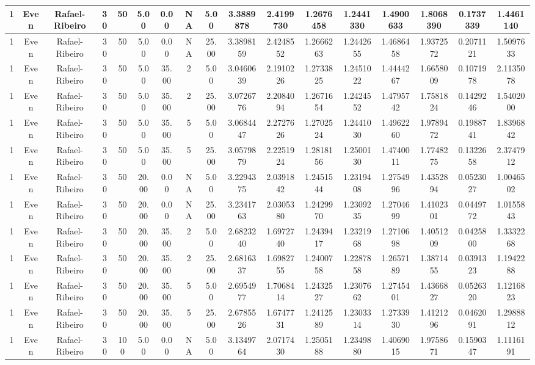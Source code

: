 \documentclass[a4paper]{article}
\begin{document}
\begin{center}
\begin{tabular}{ | c | c | c | c | c | c | c | c | c | c | c | c | c | c | c | c | c | }
		\hline
		1	&	Even	&	Rafael-Ribeiro	&	30	&	50	&	5.00	&	0.00	&	NA	&	5.00	&	3.3889878	&	2.4199730	&	1.2676458	&	1.2441330	&	1.4900633	&	1.8068390	&	0.1737339	&	1.4461140 \\
		\hline
		1	&	Even	&	Rafael-Ribeiro	&	30	&	50	&	5.00	&	0.00	&	NA	&	25.00	&	3.3898159	&	2.4248552	&	1.2666263	&	1.2442655	&	1.4686458	&	1.9372572	&	0.2071121	&	1.5097633 \\
		\hline
		1	&	Even	&	Rafael-Ribeiro	&	30	&	50	&	5.00	&	35.00	&	2	&	5.00	&	3.0460639	&	2.1910226	&	1.2733825	&	1.2451022	&	1.4444267	&	1.6658009	&	0.1071978	&	2.1135078 \\
		\hline
		1	&	Even	&	Rafael-Ribeiro	&	30	&	50	&	5.00	&	35.00	&	2	&	25.00	&	3.0726776	&	2.2084094	&	1.2671654	&	1.2424552	&	1.4795742	&	1.7581824	&	0.1429246	&	1.5402000 \\
		\hline
		1	&	Even	&	Rafael-Ribeiro	&	30	&	50	&	5.00	&	35.00	&	5	&	5.00	&	3.0684447	&	2.2727626	&	1.2702524	&	1.2441030	&	1.4962260	&	1.9789472	&	0.1988741	&	1.8396842 \\
		\hline
		1	&	Even	&	Rafael-Ribeiro	&	30	&	50	&	5.00	&	35.00	&	5	&	25.00	&	3.0579879	&	2.2251924	&	1.2818156	&	1.2500130	&	1.4740011	&	1.7748275	&	0.1322658	&	2.3747912 \\
		\hline
		1	&	Even	&	Rafael-Ribeiro	&	30	&	50	&	20.00	&	0.00	&	NA	&	5.00	&	3.2294375	&	2.0391842	&	1.2451544	&	1.2319408	&	1.2754996	&	1.4352894	&	0.0523027	&	1.0046502 \\
		\hline
		1	&	Even	&	Rafael-Ribeiro	&	30	&	50	&	20.00	&	0.00	&	NA	&	25.00	&	3.2341763	&	2.0305380	&	1.2429970	&	1.2309235	&	1.2704699	&	1.4102301	&	0.0449772	&	1.0155843 \\
		\hline
		1	&	Even	&	Rafael-Ribeiro	&	30	&	50	&	20.00	&	35.00	&	2	&	5.00	&	2.6823240	&	1.6972740	&	1.2439417	&	1.2321968	&	1.2710698	&	1.4051209	&	0.0425800	&	1.3332268 \\
		\hline
		1	&	Even	&	Rafael-Ribeiro	&	30	&	50	&	20.00	&	35.00	&	2	&	25.00	&	2.6816337	&	1.6982755	&	1.2400758	&	1.2287858	&	1.2657189	&	1.3871455	&	0.0391323	&	1.1942288 \\
		\hline
		1	&	Even	&	Rafael-Ribeiro	&	30	&	50	&	20.00	&	35.00	&	5	&	5.00	&	2.6954977	&	1.7068414	&	1.2432527	&	1.2307662	&	1.2745401	&	1.4366827	&	0.0526320	&	1.1216823 \\
		\hline
		1	&	Even	&	Rafael-Ribeiro	&	30	&	50	&	20.00	&	35.00	&	5	&	25.00	&	2.6785526	&	1.6747731	&	1.2412589	&	1.2303314	&	1.2733930	&	1.4121296	&	0.0462091	&	1.2988812 \\
		\hline
		1	&	Even	&	Rafael-Ribeiro	&	30	&	100	&	5.00	&	0.00	&	NA	&	5.00	&	3.1349764	&	2.0717430	&	1.2505188	&	1.2349880	&	1.4069015	&	1.9758671	&	0.1590347	&	1.1116191 \\

\end{tabular}
\end{center}
\end{document}
